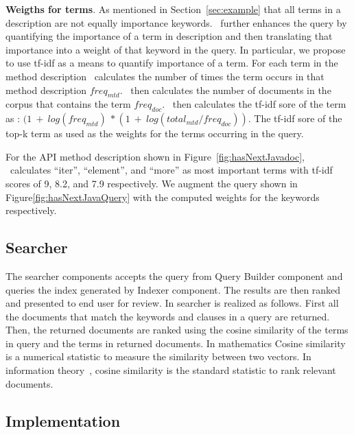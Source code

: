 \textbf{Weigths for terms}. As mentioned in Section~\ref{sec:example} that all terms in a description are not equally importance keywords. 
\tool\ further enhances the query by quantifying the importance of a term in description and then translating that importance into a weight of that keyword in the query.
In particular, we propose to use tf-idf\cite{manning2008introduction} as a means to quantify importance of a term.
For each term in the method description \tool\ calculates the number of times the term occurs in that method description $freq_{mtd}$.
\tool\ then calculates the number of documents in the corpus that contains the term $freq_{doc}$.
\tool\ then calculates the tf-idf sore of the term as :
$(1\ +\ log(freq_{mtd})\ * (1\ +\ log(total_{mtd}/freq_{doc}))$.
The tf-idf sore of the top-k term as used as the weights for the terms occurring in the query.

For the API method description  shown in Figure~\ref{fig:hasNextJavadoc}, \tool\ calculates ``iter'', ``element'', and ``more'' as most important terms with tf-idf scores of 9, 8.2, and 7.9 respectively. We augment the query shown in Figure\ref{fig:hasNextJavaQuery} with the computed weights for the keywords respectively.

\subsection{Searcher}
\label{sub:approach_searcher}

The searcher components accepts the query from Query Builder component and queries the index generated by Indexer component.
The results are then ranked and presented to end user for review.
In searcher is realized as follows. 
First all the documents that match the keywords and clauses in a query are returned.
Then, the returned documents are ranked using the cosine similarity\cite{singhal2001modern} of the terms in query and the terms in returned documents. In mathematics Cosine similarity is a numerical statistic to measure the similarity between two vectors. 
In information theory~\cite{manning2008introduction}, cosine similarity is the standard statistic to rank relevant documents.




    


\subsection{Implementation}
\label{sub:Approach_implementation}

